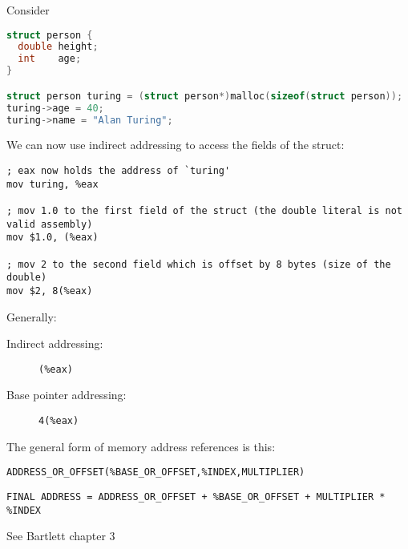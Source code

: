 
Consider
\begin{lstlisting}[language=C]
struct person {
  double height;
  int    age;
}

struct person turing = (struct person*)malloc(sizeof(struct person));
turing->age = 40;
turing->name = "Alan Turing";
\end{lstlisting}

We can now use indirect addressing to access the fields of the struct:

\begin{lstlisting}[language={[x86masm]Assembler}]
; eax now holds the address of `turing'
mov turing, %eax

; mov 1.0 to the first field of the struct (the double literal is not valid assembly)
mov $1.0, (%eax)

; mov 2 to the second field which is offset by 8 bytes (size of the double)
mov $2, 8(%eax)
\end{lstlisting}


Generally:
\begin{description}
\item[Indirect addressing:] \texttt{(\%eax)}
\item[Base pointer addressing:] \texttt{4(\%eax)}
\end{description}

The general form of memory address references is this:

\texttt{ADDRESS\_OR\_OFFSET(\%BASE\_OR\_OFFSET,\%INDEX,MULTIPLIER)}

\texttt{FINAL ADDRESS = ADDRESS\_OR\_OFFSET + \%BASE\_OR\_OFFSET + MULTIPLIER * \%INDEX}

See Bartlett chapter 3

